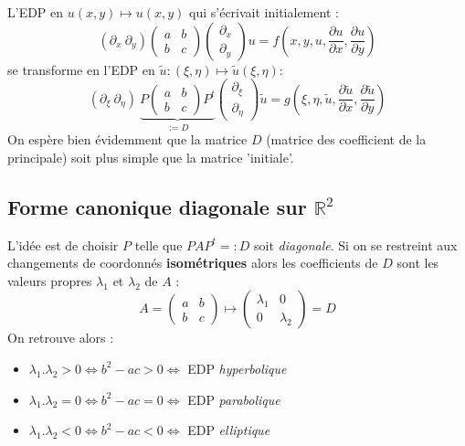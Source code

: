 \documentclass	[11pt, a4paper, openany]{book}
\begin{document}
L'EDP en $u (x,y) \mapsto u(x,y)$ qui s'écrivait initialement : 
\begin{equation}
(\partial_x\ \partial_y)\left(\begin{array}{cc}
a & b\\
b & c
\end{array}\right)\left(\begin{array}{c}
\partial_x\\
\partial_y
\end{array}\right)u = f\left(x,y,u,\frac{\partial u}{\partial x}, \frac{\partial u}{\partial y}\right)
\end{equation}
se transforme en l'EDP en $\tilde{u}:(\xi,\eta) \mapsto \tilde{u}(\xi,\eta)$:
\begin{equation}
(\partial_\xi\ \partial_\eta)\ \underbrace{P\left(\begin{array}{cc}
a & b\\
b & c
\end{array}\right)P^t}_{:= D}\left(\begin{array}{c}
\partial_\xi\\
\partial_\eta
\end{array}\right)\tilde{u} = g\left(\xi,\eta,\tilde{u},\frac{\partial \tilde{u}}{\partial x}, \frac{\partial \tilde{u}}{\partial y}\right)
\end{equation}
On espère bien évidemment que la matrice $D$ (matrice des coefficient de la principale) soit plus simple que la matrice 'initiale'.

\subsection{Forme canonique diagonale sur $\mathbb{R}^2$}
L'idée est de choisir $P$ telle que $PAP^t =: D$ soit \textit{diagonale}. Si on se restreint aux changements de coordonnés \textbf{isométriques} alors les coefficients de $D$ sont les valeurs propres $\lambda_1$ et $\lambda_2$ de $A$ :
\begin{equation}
A = \left(\begin{array}{cc}
a & b\\
b & c
\end{array}\right) \mapsto \left(\begin{array}{cc}
\lambda_1 & 0\\
0 & \lambda_2
\end{array}\right) = D
\end{equation}
On retrouve alors :
\begin{itemize}
\item $\lambda_1.\lambda_2 > 0 \Leftrightarrow b^2-ac > 0 \Leftrightarrow$ EDP \textit{hyperbolique}
\item $\lambda_1.\lambda_2 = 0 \Leftrightarrow b^2-ac = 0 \Leftrightarrow$ EDP \textit{parabolique}
\item $\lambda_1.\lambda_2 < 0 \Leftrightarrow b^2-ac < 0 \Leftrightarrow$ EDP \textit{elliptique}
\end{itemize}
\end{document}

